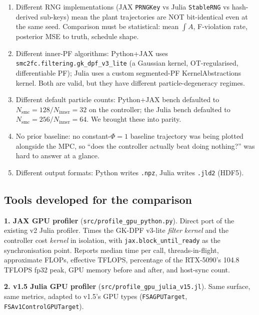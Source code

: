 \documentclass[11pt,a4paper]{article}
\begin{document}
\begin{enumerate}[itemsep=2pt]
  \item Different RNG implementations (JAX \texttt{PRNGKey} vs
        Julia \texttt{StableRNG} vs hash-derived sub-keys) mean
        the plant trajectories are NOT bit-identical even at the
        same seed. Comparison must be statistical: mean $\int A$,
        F-violation rate, posterior MSE to truth, schedule shape.
  \item Different inner-PF algorithms: Python+JAX uses
        \texttt{smc2fc.filtering.gk\_dpf\_v3\_lite} (a Gaussian
        kernel, OT-regularised, differentiable PF); Julia uses a
        custom segmented-PF KernelAbstractions kernel. Both are
        valid, but they have different particle-degeneracy
        regimes.
  \item Different default particle counts: Python+JAX bench
        defaulted to $N_{\text{smc}}=128 / N_{\text{inner}}=32$ on
        the controller; the Julia bench defaulted to
        $N_{\text{smc}}=256 / N_{\text{inner}}=64$. We brought
        these into parity.
  \item No prior baseline: no constant-$\Phi=1$ baseline trajectory
        was being plotted alongside the MPC, so ``does the
        controller actually beat doing nothing?'' was hard to
        answer at a glance.
  \item Different output formats: Python writes \texttt{.npz}, Julia
        writes \texttt{.jld2} (HDF5).
\end{enumerate}

\subsection{Tools developed for the comparison}

\textbf{1. JAX GPU profiler}
(\texttt{src/profile\_gpu\_python.py}). Direct port of the existing
v2 Julia profiler. Times the GK-DPF v3-lite \emph{filter kernel}
and the controller cost \emph{kernel} in isolation, with
\texttt{jax.block\_until\_ready} as the synchronisation point. Reports
median time per call, threads-in-flight, approximate FLOPs,
effective TFLOPS, percentage of the RTX-5090's 104.8 TFLOPS fp32
peak, GPU memory before and after, and host-sync count.

\textbf{2. v1.5 Julia GPU profiler}
(\texttt{src/profile\_gpu\_julia\_v15.jl}). Same surface, same
metrics, adapted to v1.5's GPU types (\texttt{FSAGPUTarget},
\texttt{FSAv1ControlGPUTarget}).
\end{document}
